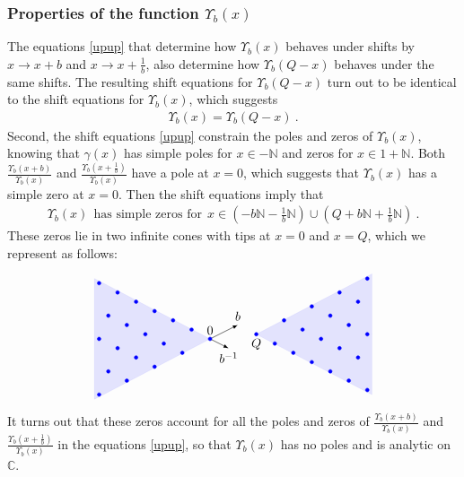 \documentclass[12pt, a4paper, notitlepage, twoside]{report}
\numberwithin{equation}{section}
\theoremstyle{break}
\begin{document}
\subsubsection{Properties of the function $\Upsilon_b(x)$}

The equations \eqref{upup} that determine how $\Upsilon_b(x)$ behaves under shifts by $x\to x+b$ and $x\to x+\frac{1}{b}$, also determine how $\Upsilon_b(Q-x)$ behaves under the same shifts.
The resulting shift equations for $\Upsilon_b(Q-x)$ turn out to be identical to the shift equations for $\Upsilon_b(x)$, which suggests 
\begin{align}
 \boxed{\Upsilon_b(x) = \Upsilon_b(Q-x)}\ .
\label{upq}
\end{align}
Second, the shift equations \eqref{upup} constrain the poles and zeros of  $\Upsilon_b(x)$, knowing that $\gamma(x)$ has simple poles for $x\in -{\mathbb{N}}$ and zeros for $x\in 1+{\mathbb{N}}$.
Both $\frac{\Upsilon_b(x+b)}{\Upsilon_b(x)}$ and $\frac{\Upsilon_b(x+\frac{1}{b})}{\Upsilon_b(x)}$ have a pole at $x=0$, which suggests that $\Upsilon_b(x)$ has a simple zero at $x=0$.
Then the shift equations imply that 
\begin{align}
 \boxed{\Upsilon_b(x)\ \ \text{has simple zeros for}\ \ x\in  \left(-b{\mathbb{N}} -\tfrac{1}{b}{\mathbb{N}} \right) \cup \left( Q+b{\mathbb{N}} + \tfrac{1}{b}{\mathbb{N}}\right)} \ .
\label{xbn}
\end{align}
These zeros lie in two infinite cones with tips at $x=0$ and $x=Q$, which we represent as follows:
\begin{align}
\begin{tikzpicture}[scale = 1.3, baseline=(current  bounding  box.center)]
\node[above] at (0, 0) {$0$};
\node[below] at (1, .1) {$Q$};
\draw [latex-latex] (.6, .3) node[above] {$b$} -- (0, 0) -- (.4, -.2) node[below] {$b^{-1}$};
\begin{scope}[rotate = 90]
\filldraw[blue, opacity = .1] (0,0) -- (-1.3, 2.5) -- (1.3, 2.5) -- cycle;
\clip (-1.4, -.2) -- (1.4, -.2) -- (1.4, 2.5) -- (-1.4, 2.5) -- cycle;
\foreach \x in {0, 1,...,4}{
  \foreach \y in {0, 1,...,6}{
    \node[draw,circle,inner sep=1pt,fill,blue] at (-.3*\x +.2*\y, .6*\x +.4*\y) {};
  }}
  \end{scope}
\begin{scope}[shift = {(1, .1)}, rotate = -90]
\filldraw[blue, opacity = .1] (0,0) -- (-1.3, 2.5) -- (1.3, 2.5) -- cycle;
\clip (-1.4, -.2) -- (1.4, -.2) -- (1.4, 2.5) -- (-1.4, 2.5) -- cycle;
\foreach \x in {0, 1,...,4}{
  \foreach \y in {0, 1,...,6}{
    \node[draw,circle,inner sep=1pt,fill,blue] at (-.3*\x +.2*\y, .6*\x +.4*\y) {};
  }}  
\end{scope}  
 \end{tikzpicture}
\label{lines}
\end{align}
It turns out that these zeros account for all the poles and zeros of $\frac{\Upsilon_b(x+b)}{\Upsilon_b(x)}$ and $\frac{\Upsilon_b(x+\frac{1}{b})}{\Upsilon_b(x)}$ in the equations \eqref{upup}, so that $\Upsilon_b(x)$ has no poles and is analytic on ${\mathbb{C}}$. 
\end{document}
